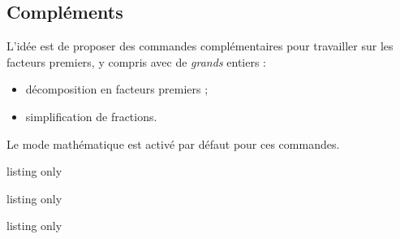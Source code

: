 \begin{PresCodePL}{}
\end{PresCodePL}

\begin{PresCodePL}{}
\end{PresCodePL}

\begin{PresCodePL}{}
\end{PresCodePL}

\subsection{Compléments}\label{facteurspremiers}

\begin{tipblock}
 L'idée est de proposer des commandes complémentaires pour travailler sur les facteurs premiers, y compris avec de \textit{grands} entiers :

\begin{itemize}
	\item décomposition en facteurs premiers ;
	\item simplification de fractions.
\end{itemize}

Le mode mathématique est activé par défaut pour ces commandes.
\end{tipblock}

\begin{PresCodeTexPL}{listing only}
\end{PresCodeTexPL}

\begin{PresCodeTexPL}{listing only}
\end{PresCodeTexPL}

\begin{PresCodeTexPL}{listing only}
\end{PresCodeTexPL}

\begin{PresCodePL}{}
\\
\\
\end{PresCodePL}

